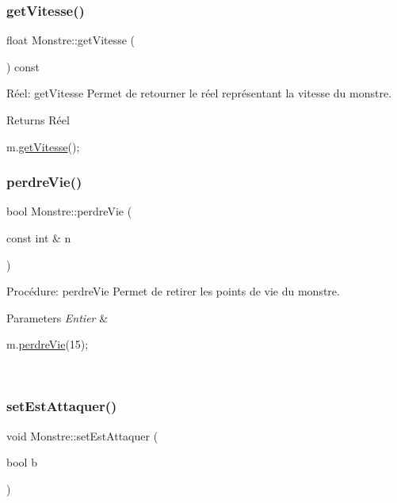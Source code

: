 \subsubsection{\texorpdfstring{get\+Vitesse()}{getVitesse()}}
{\footnotesize\ttfamily float Monstre\+::get\+Vitesse (\begin{DoxyParamCaption}{ }\end{DoxyParamCaption}) const}



Réel\+: get\+Vitesse Permet de retourner le réel représentant la vitesse du monstre. 

\begin{DoxyReturn}{Returns}
Réel 
\begin{DoxyCode}
m.\hyperlink{classMonstre_a8f94de3aed809fd81f283afce7c3feba}{getVitesse}();
\end{DoxyCode}
 
\end{DoxyReturn}
\mbox{\label{classMonstre_af6d0a1f276465d12d50db387855e62d3}} 
\subsubsection{\texorpdfstring{perdre\+Vie()}{perdreVie()}}
{\footnotesize\ttfamily bool Monstre\+::perdre\+Vie (\begin{DoxyParamCaption}\item[{const int \&}]{n }\end{DoxyParamCaption})}



Procédure\+: perdre\+Vie Permet de retirer les points de vie du monstre. 


\begin{DoxyParams}{Parameters}
{\em Entier} & 
\begin{DoxyCode}
m.\hyperlink{classMonstre_af6d0a1f276465d12d50db387855e62d3}{perdreVie}(15);
\end{DoxyCode}
 \\
\hline
\end{DoxyParams}
\mbox{\label{classMonstre_a74cb4551bed1c53c3071b965907050b0}} 
\subsubsection{\texorpdfstring{set\+Est\+Attaquer()}{setEstAttaquer()}}
{\footnotesize\ttfamily void Monstre\+::set\+Est\+Attaquer (\begin{DoxyParamCaption}\item[{bool}]{b }\end{DoxyParamCaption})}




